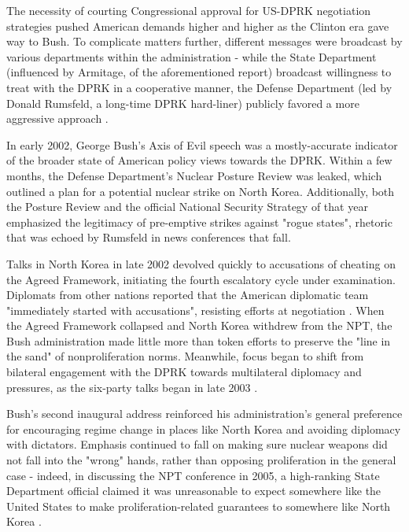 \documentclass{article}
\begin{document}
The necessity of courting Congressional approval for US-DPRK negotiation strategies pushed American demands higher and higher as the Clinton era gave way to Bush. To complicate matters further, different messages were broadcast by various departments within the administration - while the State Department (influenced by Armitage, of the aforementioned report) broadcast willingness to treat with the DPRK in a cooperative manner, the Defense Department (led by Donald Rumsfeld, a long-time DPRK hard-liner\cite{rumsfeld}) publicly favored a more aggressive approach \cite{harnisch}.

In early 2002, George Bush's Axis of Evil speech was a mostly-accurate indicator of the broader state of American policy views towards the DPRK. Within a few months, the Defense Department's Nuclear Posture Review was leaked, which outlined a plan for a potential nuclear strike on North Korea\cite{npreview}. Additionally, both the Posture Review and the official National Security Strategy of that year emphasized the legitimacy of pre-emptive strikes against "rogue states"\cite{bleiker}, rhetoric that was echoed by Rumsfeld in news conferences that fall\cite{harnisch}.

Talks in North Korea in late 2002 devolved quickly to accusations of cheating on the Agreed Framework, initiating the fourth escalatory cycle under examination. Diplomats from other nations reported that the American diplomatic team "immediately started with accusations", resisting efforts at negotiation \cite{bleiker}. When the Agreed Framework collapsed and North Korea withdrew from the NPT, the Bush administration made little more than token efforts to preserve the "line in the sand" of nonproliferation norms\cite{huntley}. Meanwhile, focus began to shift from bilateral engagement with the DPRK towards multilateral diplomacy and pressures, as the six-party talks began in late 2003 \cite{crs13}.

Bush's second inaugural address reinforced his administration's general preference for encouraging regime change in places like North Korea and avoiding diplomacy with dictators. Emphasis continued to fall on making sure nuclear weapons did not fall into the "wrong" hands, rather than opposing proliferation in the general case - indeed, in discussing the NPT conference in 2005, a high-ranking State Department official claimed it was unreasonable to expect somewhere like the United States to make proliferation-related guarantees to somewhere like North Korea \cite{huntley}.
\end{document}
